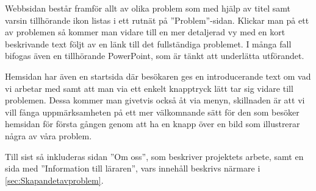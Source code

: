 \textcolor{Mahogany}{Webbsidan består framför allt av olika problem som med hjälp av titel samt varsin tillhörande ikon listas i ett rutnät på ''Problem''-sidan. Klickar man på ett av problemen så kommer man vidare till en mer detaljerad vy med en kort beskrivande text följt av en länk till det fullständiga problemet. I många fall bifogas även en tillhörande PowerPoint, som är tänkt att underlätta utförandet.}

\textcolor{Mahogany}{Hemsidan har även en startsida där besökaren ges en introducerande text om vad vi arbetar med samt att man via ett enkelt knapptryck lätt tar sig vidare till problemen. Dessa kommer man givetvis också åt via menyn, skillnaden är att vi vill fånga uppmärksamheten på ett mer välkomnande sätt för den som besöker hemsidan för första gången genom att ha en knapp över en bild som illustrerar några av våra problem.}

\textcolor{Mahogany}{Till sist så inkluderas sidan ''Om oss'', som beskriver projektets arbete, samt en sida med ''Information till läraren'', vars innehåll beskrivs närmare i \ref{sec:Skapandetavproblem}.}